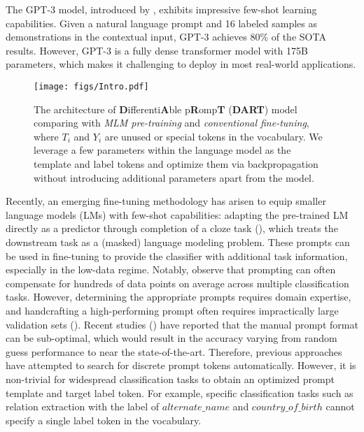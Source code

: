 \documentclass{article} \usepackage{iclr2022_conference,times}
\begin{document}
The GPT-3 model, introduced by \cite{DBLP:conf/nips/BrownMRSKDNSSAA20}, exhibits impressive few-shot learning capabilities. 
Given a natural language prompt and 16 labeled samples as demonstrations in the contextual input, GPT-3 achieves 80\% of the SOTA results.
However, GPT-3 is a fully dense transformer model with 175B parameters, which makes it challenging to deploy in most real-world applications. 






\begin{figure} 
\centering 
\texttt{[image: figs/Intro.pdf]}  
\caption{The architecture of \textbf{D}ifferenti\textbf{A}ble p\textbf{R}omp\textbf{T} (\textbf{DART}) model comparing with \emph{MLM pre-training} and \emph{conventional fine-tuning}, where $T_i$ and $Y_i$ are unused or special tokens in the vocabulary.
 {\color{highlight}
We leverage a few parameters within the language model as the template and label tokens and optimize them via backpropagation without introducing additional parameters apart from the model. }
 } 
\label{model}  
\end{figure}


Recently, an emerging fine-tuning methodology has arisen to equip smaller language models (LMs) with few-shot capabilities: adapting the pre-trained LM directly as a predictor through completion of a cloze task (\cite{DBLP:conf/eacl/SchickS21,DBLP:journals/corr/abs-2009-07118,DBLP:journals/corr/abs-2012-15723,DBLP:journals/corr/abs-2103-10385}), which treats the downstream task as a (masked) language modeling problem.
These prompts can be used in fine-tuning to provide the classifier with additional task information, especially in the low-data regime. 
Notably, \cite{DBLP:journals/corr/abs-2103-08493} observe that prompting can often compensate for hundreds of data points on average across multiple classification tasks.
However, determining the appropriate prompts requires domain expertise, and handcrafting a high-performing prompt often requires impractically large validation sets (\cite{Ethan2021true}). 
Recent studies (\cite{DBLP:journals/corr/abs-2104-08786,DBLP:journals/corr/abs-2102-09690}) have reported that the manual prompt format can be sub-optimal, which would result in the accuracy varying from random guess performance to near the state-of-the-art.
Therefore, previous approaches have attempted to search for discrete prompt tokens automatically. 
However, it is non-trivial for widespread classification tasks to obtain an optimized prompt template and target label token.
For example, specific classification tasks such as relation extraction with the label of $alternate\_name$ and $country\_of\_birth$ cannot specify a single label token in the vocabulary. 
\end{document}
